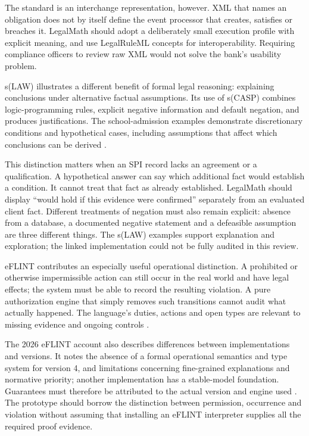 \documentclass[12pt,a4paper,oneside,openany]{book}
\begin{document}
The standard is an interchange representation, however. XML that names an
obligation does not by itself define the event processor that creates, satisfies
or breaches it. LegalMath should adopt a deliberately small execution profile
with explicit meaning, and use LegalRuleML concepts for interoperability. Requiring
compliance officers to review raw XML would not solve the bank's usability problem.

s(LAW) illustrates a different benefit of formal legal reasoning: explaining
conclusions under alternative factual assumptions. Its use of s(CASP) combines
logic-programming rules, explicit negative information and default negation, and
produces justifications. The school-admission examples demonstrate discretionary
conditions and hypothetical cases, including assumptions that affect which
conclusions can be derived \citep[secs.~4--5]{slaw2024}.

This distinction matters when an SPI record lacks an agreement or a qualification.
A hypothetical answer can say which additional fact would establish a condition.
It cannot treat that fact as already established. LegalMath should display
``would hold if this evidence were confirmed'' separately from an evaluated
client fact. Different treatments of negation must also remain explicit: absence
from a database, a documented negative statement and a defeasible assumption are
three different things. The s(LAW) examples support explanation and exploration;
the linked implementation could not be fully audited in this review.

eFLINT contributes an especially useful operational distinction. A prohibited or
otherwise impermissible action can still occur in the real world and have legal
effects; the system must be able to record the resulting violation. A pure
authorization engine that simply removes such transitions cannot audit what
actually happened. The language's duties, actions and open types are relevant
to missing evidence and ongoing controls \citep[secs.~3--5]{eflint2026}.

The 2026 eFLINT account also describes differences between implementations and
versions. It notes the absence of a formal operational semantics and type system
for version 4, and limitations concerning fine-grained explanations and normative
priority; another implementation has a stable-model foundation. Guarantees must
therefore be attributed to the actual version and engine used
\citep[secs.~6--7]{eflint2026}. The prototype should borrow the distinction between
permission, occurrence and violation without assuming that installing an eFLINT
interpreter supplies all the required proof evidence.
\end{document}
